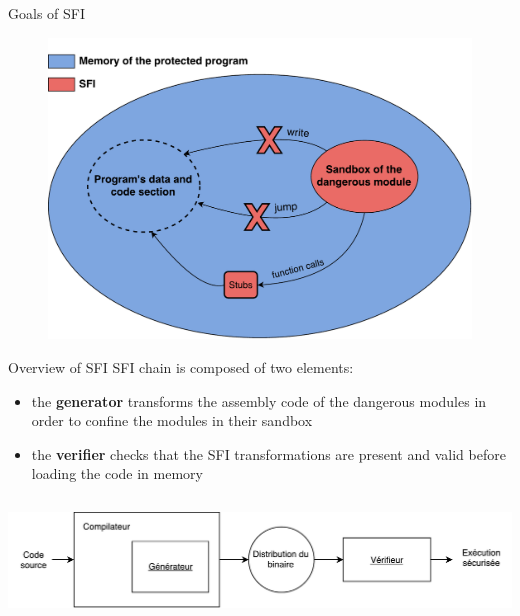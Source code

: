\documentclass{beamer}
\begin{document}
\begin{frame}[c]{Goals of SFI}
\begin{figure}
\centering
\includegraphics[width=1\textwidth]{images/sfi_principle.pdf}
\end{figure}

\end{frame}

\begin{frame}{Overview of SFI} %
	SFI chain is composed of two elements:
		\begin{itemize}
			\item the \textbf{generator} transforms the assembly code of the dangerous modules in order to confine the modules in their sandbox
			\item the \textbf{verifier} checks that the SFI transformations are present and valid before loading the code in memory
		\end{itemize}
		\vspace{5mm}
		\begin{columns}
			\column{\dimexpr\paperwidth-10pt}
			\begin{center}
			\includegraphics[width=0.95\paperwidth]{images/sfi_schema.pdf}
			\end{center}
		\end{columns}
\end{frame}
\end{document}
